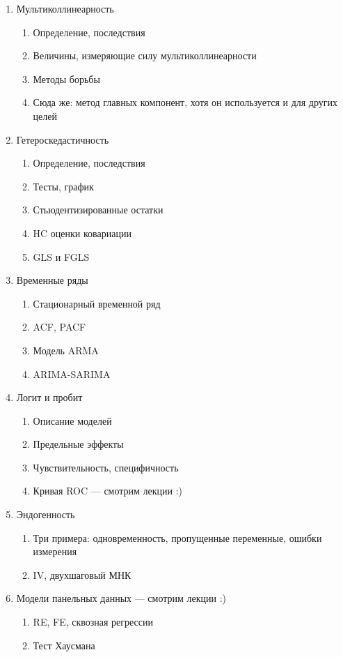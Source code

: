 \documentclass[12pt, a4paper]{article}
\begin{document}
\begin{enumerate}
\item Мультиколлинеарность
\begin{enumerate}
\item Определение, последствия
\item Величины, измеряющие силу мультиколлинеарности
\item Методы борьбы
\item Сюда же: метод главных компонент, хотя он используется и для других целей
\end{enumerate}


\item Гетероскедастичность
\begin{enumerate}
\item Определение, последствия
\item Тесты, график
\item Стьюдентизированные остатки
\item HC оценки ковариации
\item GLS и FGLS
\end{enumerate}

\item Временные ряды
\begin{enumerate}
\item Стационарный временной ряд
\item ACF, PACF
\item Модель ARMA
\item ARIMA-SARIMA
\end{enumerate}


\item Логит и пробит
\begin{enumerate}
\item Описание моделей
\item Предельные эффекты
\item Чувствительность, специфичность
\item Кривая ROC — смотрим лекции :)
\end{enumerate}

\item Эндогенность
\begin{enumerate}
\item Три примера: одновременность, пропущенные переменные, ошибки измерения
\item IV, двухшаговый МНК
\end{enumerate}


\item Модели панельных данных — смотрим лекции :)
\begin{enumerate}
\item  RE, FE, сквозная регрессии
\item  Тест Хаусмана
\end{enumerate}


\end{enumerate}
\end{document}
